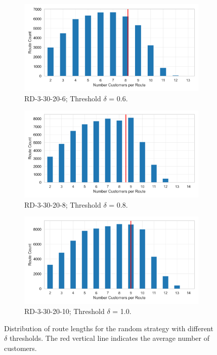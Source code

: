 \begin{figure}[ht]
	\centering
	\begin{subfigure}[t]{.5\textwidth}
		\centering
		\includegraphics[width=\linewidth]{pictures/dataset_structure/no_cust_plot_RandomData_3_30_20_6.png}
		\caption{RD-3-30-20-6; Threshold $\delta$ = 0.6.}
		\label{fig:ds-a}
	\end{subfigure}%
	\begin{subfigure}[t]{.5\textwidth}
		\centering
		\includegraphics[width=\linewidth]{pictures/dataset_structure/no_cust_plot_RandomData_3_30_20_8.png}
		\caption{RD-3-30-20-8; Threshold $\delta$ = 0.8.}
		\label{fig:ds-b}
	\end{subfigure}
	\begin{subfigure}{.5\textwidth}
		\centering
		\includegraphics[width=\linewidth]{pictures/dataset_structure/no_cust_plot_RandomData_3_30_20_10.png}
		\caption{RD-3-30-20-10; Threshold $\delta$ = 1.0.}
		\label{fig:ds-c}
	\end{subfigure}
	\caption[Distribution of route lengths for the random strategy with different $\delta$ thresholds.]
	{Distribution of route lengths for the random strategy with different $\delta$ thresholds. The red vertical line indicates the average number of customers.}
	\label{fig:route-dists_randomdata}
\end{figure}
\clearpage

